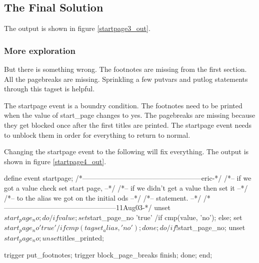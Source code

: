 \subsection{The Final Solution}
The output is shown in figure \vref{startpage3_out}.

\subsubsection{More exploration}
But there is something wrong.  The footnotes are missing from the first section. 
All the pagebreaks are missing.  Sprinkling a few putvars and putlog statements
through this tagset is helpful.

The startpage event is a boundry condition.  The footnotes need to be printed when
the value of start\_page changes to yes.  The pagebreaks are missing because they
get blocked once after the first titles are printed.  The startpage event needs
to unblock them in order for everything to return to normal.

Changing the startpage event to the following will fix everything.
The output is shown in figure \vref{startpage4_out}.

\begin{sfvcode}
        define event startpage;
            /*---------------------------------------------------eric-*/
            /*-- if we got a value check set start page,            --*/
            /*-- if we didn't get a value then set it               --*/
            /*-- to the alias we got on the initial ods             --*/
            /*-- statement.                                         --*/
            /*------------------------------------------------11Aug03-*/
            unset $start_page_no;

            do /if value;
                set $start_page_no 'true' /if cmp(value, 'no');
            else;
                set $start_page_no 'true' /if cmp(tagset_alias, 'no');
            done;
            
            do /if !$start_page_no;
                unset $start_page_no;
                unset $titles_printed;

                trigger put_footnotes;
                trigger block_page_breaks finish;
            done;
        end;
\end{sfvcode}

